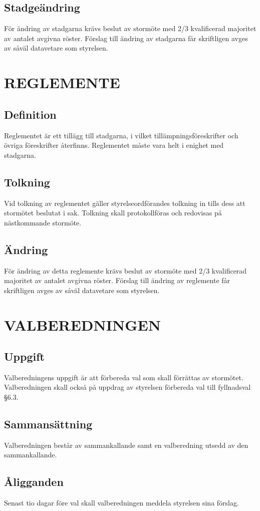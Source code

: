 \documentclass[a4paper]{article}
\begin{document}
{{  \subsection{Stadgeändring}
  För ändring av stadgarna krävs beslut av stormöte med 2/3 kvalificerad majoritet av antalet avgivna röster. Förslag till ändring av stadgarna får skriftligen avges av såväl datavetare som styrelsen.}
\section{REGLEMENTE}
{\subsection{Definition}
  Reglementet är ett tillägg till stadgarna, i vilket tillämpningsföreskrifter och övriga föreskrifter återfinns. Reglementet måste vara helt i enighet med stadgarna.
  \subsection{Tolkning}
  Vid tolkning av reglementet gäller styrelseordförandes tolkning in tills dess att stormötet beslutat i sak. Tolkning skall protokollföras och redovisas på nästkommande stormöte.
  \subsection{Ändring}
  För ändring av detta reglemente krävs beslut av stormöte med 2/3 kvalificerad majoritet av antalet avgivna röster. Förslag till ändring av reglemente får skriftligen avges av såväl datavetare som styrelsen.}
\section{VALBEREDNINGEN}
{\subsection{Uppgift}
  Valberedningens uppgift är att förbereda val som skall förrättas av stormötet. Valberedningen skall också på uppdrag av styrelsen förbereda val till fyllnadsval §6.3.
  \subsection{Sammansättning}
  Valberedningen består av sammankallande samt en valberedning utsedd av den sammankallande.
  \subsection{Åligganden}
  Senast tio dagar före val skall valberedningen meddela styrelsen sina förslag.
}}
\end{document}
